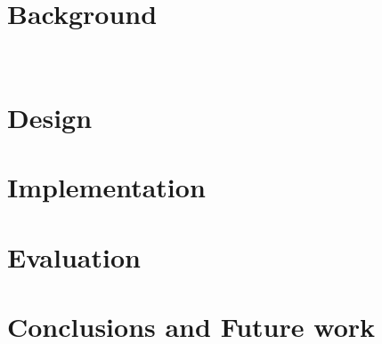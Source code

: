 \documentclass[]{report}
\begin{document}


\chapter{Background}



~\cite{dunkels04contiki}

\chapter{Design}
\label{sect:design}

\chapter{Implementation}
\label{sect:implementation}


\chapter{Evaluation}
\label{sect:evaluation}



\chapter{Conclusions and Future work}
\label{sect:conclusions}




\end{document}
